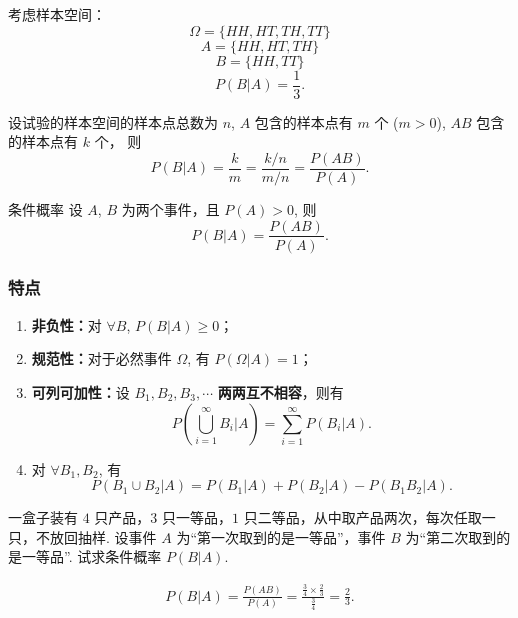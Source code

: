 \documentclass[12pt, a4paper, oneside, UTF8]{ctexbook}
\begin{document}
\begin{solution}
    考虑样本空间：
    \[\Omega = \{HH , HT , TH , TT\}\]
    \[A = \{HH , HT , TH\}\]
    \[B = \{HH , TT\}\]
    \[P\left(B | A\right) = \frac{1}{3}.\]
\end{solution}

\begin{corollary}
    设试验的样本空间的样本点总数为 \(n\), \(A\) 包含的样本点有 \(m\) 个 (\(m > 0\)), \(AB\) 包含的样本点有 \(k\) 个， 则
    \[P\left(B|A\right) = \frac{k}{m} = \frac{k/n}{m/n} = \frac{P\left(AB\right)}{P\left(A\right)}.\]
\end{corollary}

\begin{defn}{条件概率}
    设 \(A\), \(B\) 为两个事件，且 \(P\left(A\right) > 0\), 则
    \[P\left(B|A\right) = \frac{P\left(AB\right)}{P\left(A\right)}.\]
\end{defn}

\subsubsection{特点}
\begin{enumerate}
    \item \textbf{非负性：}对 \(\forall B\), \(P\left(B | A\right) \geqslant 0\)；
    \item \textbf{规范性：}对于必然事件 \(\Omega\), 有 \(P\left(\Omega | A\right) = 1\)；
    \item \textbf{可列可加性：}设 \(B_1 , B_2 , B_3 , \cdots\) \textbf{两两互不相容}，则有\[P\left(\bigcup_{i = 1}^\infty B_i | A\right) = \sum_{i = 1}^{\infty} P\left(B_i | A\right).\]
    \item 对 \(\forall B_1 , B_2\), 有 \[P\left(B_1 \cup B_2 | A\right) = P\left(B_1 | A\right) + P\left(B_2 | A\right) - P\left(B_1 B_2 | A\right).\]
\end{enumerate}

\begin{example}
    一盒子装有 \(4\) 只产品，\(3\) 只一等品，\(1\) 只二等品，从中取产品两次，每次任取一只，不放回抽样. 设事件 \(A\) 为“第一次取到的是一等品”，事件 \(B\) 为“第二次取到的是一等品”. 试求条件概率 \(P\left(B | A\right)\).
\end{example}

\begin{solution}
    \begin{align*}
        P\left(B | A\right) = \frac{P\left(AB\right)}{P\left(A\right)} = \frac{\frac{3}{4}\times \frac{2}{3}}{\frac{3}{4}} = \frac{2}{3}.
    \end{align*}
\end{solution}
\end{document}
